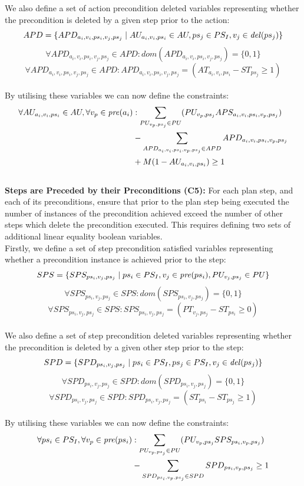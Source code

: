 We also define a set of action precondition deleted variables representing whether the precondition is deleted by a given step prior to the action:
\[APD=\{APD_{a_i,v_i,ps_i,v_j,ps_j}\mid AU_{a_i,v_i,ps_i}\in AU, ps_j\in PS_I,v_j\in\mathit{del}(ps_j)\}\]
\[\forall APD_{a_i,v_i,ps_i,v_j,ps_j}\in APD:\mathit{dom}(APD_{a_i,v_i,ps_i,v_j,ps_j})=\{0,1\}\]
\[\forall APD_{a_i,v_i,ps_i,v_j,ps_j}\in APD: APD_{a_i,v_i,ps_i,v_j,ps_j}=(AT_{a_i,v_i,ps_i}-ST_{ps_j}\geq 1)\]\\


By utilising these variables we can now define the constraints:
\begin{align*}
\forall AU_{a_i,v_i,ps_i}\in AU, \forall v_p\in\mathit{pre} (a_i)&: \sum_{PU_{v_p,ps_j}\in PU}(PU_{v_p,ps_j}APS_{a_i,v_i,ps_i,v_p,ps_j})\\&-\sum_{APD_{a_i,v_i,ps_i,v_p,ps_j}\in APD}APD_{a_i,v_i,ps_i,v_p,ps_j}\\&+M(1-AU_{a_i,v_i,ps_i})\geq 1
\end{align*}\\


\textbf{Steps are Preceded by their Preconditions (C5):} For each plan step, and each of its preconditions, ensure that prior to the plan step being executed the number of instances of the precondition achieved exceed the number of other steps which delete the precondition executed. This requires defining two sets of additional linear equality boolean variables.\\


Firstly, we define a set of step precondition satisfied variables representing whether a precondition instance is achieved prior to the step:
\[SPS=\{SPS_{ps_i,v_j,ps_j}\mid ps_i\in PS_I, v_j\in\mathit{pre} (ps_i), PU_{v_j,ps_j}\in PU\}\]
\[\forall SPS_{ps_i,v_j,ps_j}\in SPS:\mathit{dom}(SPS_{ps_i,v_j,ps_j})=\{0,1\}\]
\[\forall SPS_{ps_i,v_j,ps_j}\in SPS: SPS_{ps_i,v_j,ps_j}=(PT_{v_j,ps_j}-ST_{ps_i}\geq 0)\]\\


We also define a set of step precondition deleted variables representing whether the precondition is deleted by a given other step prior to the step:
\[SPD=\{SPD_{ps_i,v_j,ps_j}\mid ps_i\in PS_I, ps_j\in PS_I,v_j\in\mathit{del}(ps_j)\}\]
\[\forall SPD_{ps_i,v_j,ps_j}\in SPD:\mathit{dom}(SPD_{ps_i,v_j,ps_j})=\{0,1\}\]
\[\forall SPD_{ps_i,v_j,ps_j}\in SPD: SPD_{ps_i,v_j,ps_j}=(ST_{ps_i}-ST_{ps_j}\geq 1)\]\\


By utilising these variables we can now define the constraints:
\begin{align*}
\forall ps_i\in PS_I, \forall v_p\in\mathit{pre} (ps_i)&: \sum_{PU_{v_p,ps_j}\in PU}(PU_{v_p,ps_j}SPS_{ps_i,v_p,ps_j})\\&-\sum_{SPD_{ps_i,v_p,ps_j}\in SPD}SPD_{ps_i,v_p,ps_j}\geq 1
\end{align*}\\


